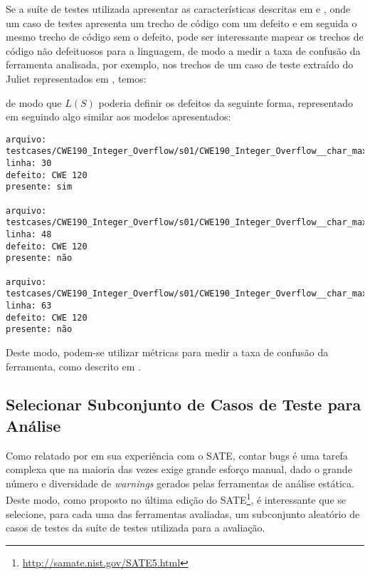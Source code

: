 Se a suíte de testes utilizada apresentar as características descritas em \cite{nsa} e \cite{harvard}, onde um caso de testes apresenta um trecho de código com um defeito e em seguida o mesmo trecho de código sem o defeito, pode ser interessante mapear os trechos de código não defeituosos para a linguagem, de modo a medir a taxa de confusão da ferramenta analisada, por exemplo, nos trechos de um caso de teste extraído do Juliet representados em , temos:

de modo que $L(S)$ poderia definir os defeitos da seguinte forma, representado em  seguindo algo similar aos modelos apresentados:
\begin{lstlisting}[breaklines=true, label=exemplo_LS, caption=Exemplo de linguagem para relatórios de defeitos\index{defeito}]
arquivo: testcases/CWE190_Integer_Overflow/s01/CWE190_Integer_Overflow__char_max_add_01.c
linha: 30
defeito: CWE 120
presente: sim

arquivo: testcases/CWE190_Integer_Overflow/s01/CWE190_Integer_Overflow__char_max_add_01.c
linha: 48
defeito: CWE 120
presente: não

arquivo: testcases/CWE190_Integer_Overflow/s01/CWE190_Integer_Overflow__char_max_add_01.c
linha: 63
defeito: CWE 120
presente: não
\end{lstlisting}

Deste modo, podem-se utilizar métricas para medir a taxa de confusão da ferramenta, como descrito em \cite{nsa}.

\subsection{Selecionar Subconjunto de Casos de Teste para Análise}

Como relatado por \cite{seatbelts} em sua experiência com o SATE, contar bugs é uma tarefa complexa que na maioria das vezes exige grande esforço manual, dado o grande número e diversidade de \textit{warnings} gerados pelas ferramentas de análise estática. Deste modo, como proposto no última edição do SATE\footnote{\url{http://samate.nist.gov/SATE5.html}}, é interessante que se selecione, para cada uma das ferramentas avaliadas, um subconjunto aleatório de casos de testes da suíte de testes utilizada para a avaliação.

